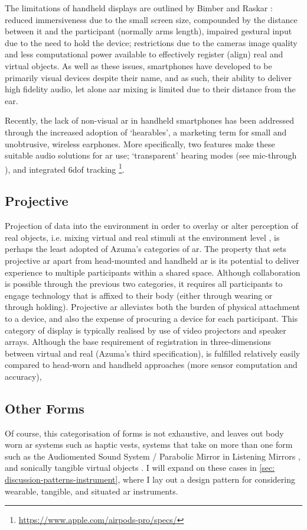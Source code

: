 The limitations of handheld displays are outlined by Bimber and Raskar \citeyearpar[pp. 79-83]{bimber2005}: reduced immersiveness due to the small screen size, compounded by the distance between it and the participant (normally arms length), impaired gestural input due to the need to hold the device; restrictions due to the cameras image quality and less computational power available to effectively register (align) real and virtual objects. As well as these issues, smartphones have developed to be primarily visual devices despite their name, and as such, their ability to deliver high fidelity audio, let alone \gls{aar} mixing is limited due to their distance from the ear. 

Recently, the lack of non-visual \gls{ar} in handheld smartphones has been addressed through the increased adoption of `hearables', a marketing term for small and unobtrusive, wireless earphones. More specifically, two features make these suitable audio solutions for \gls{ar} use; `transparent' hearing modes (see mic-through \citep{lindeman2008}), and integrated \gls{6dof} tracking \footnote{\url{https://www.apple.com/airpods-pro/specs/}}.

\subsection{Projective}\label{sec: ar-forms-proj}
Projection of data into the environment in order to overlay or alter perception of real objects, i.e. mixing virtual and real stimuli at the environment level \citep{lindeman2007}, is perhaps the least adopted of Azuma's categories of \gls{ar}. The property that sets projective \gls{ar} apart from head-mounted and handheld \gls{ar} is its potential to deliver experience to multiple participants within a shared space. Although collaboration is possible through the previous two categories, it requires all participants to engage technology that is affixed to their body (either through wearing or through holding). Projective \gls{ar} alleviates both the burden of physical attachment to a device, and also the expense of procuring a device for each participant. This category of display is typically realised by use of video projectors and speaker arrays. Although the base requirement of registration in three-dimensions between virtual and real (Azuma's third specification), is fulfilled relatively easily compared to head-worn and handheld approaches (more sensor computation and accuracy), 

\subsection{Other Forms}\label{sec: ar-forms-other}
Of course, this categorisation of forms is not exhaustive, and leaves out body worn \gls{ar} systems such as haptic vests, systems that take on more than one form such as the Audiomented Sound System / Parabolic Mirror in Listening Mirrors \citep{chevalier2020}, and sonically tangible virtual objects \citep{schraffenberger2015}. I will expand on these cases in \autoref{sec: discussion-patterns-instrument}, where I lay out a design pattern for considering wearable, tangible, and situated \gls{ar} instruments.



